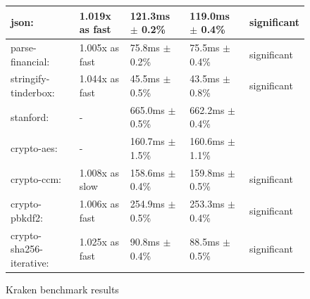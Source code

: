 \documentclass{article}
\begin{document}
\begin{figure}[H]
\begin{tabular}{|l|l|l|l|l|}
\hline\hline
      json:                     & 1.019x as fast   &  121.3ms $\pm$ 0.2\% &   119.0ms $\pm$ 0.4\%  &   significant\\
\hline\hspace{0.5em} parse-financial:        & 1.005x as fast   &   75.8ms $\pm$ 0.2\% &    75.5ms $\pm$ 0.4\%  &   significant\\
\hline\hspace{0.5em} stringify-tinderbox:    & 1.044x as fast   &   45.5ms $\pm$ 0.5\% &    43.5ms $\pm$ 0.8\%  &   significant\\
\hline\hline
      stanford:                 & -                &  665.0ms $\pm$ 0.5\% &   662.2ms $\pm$ 0.4\%  &\\
\hline\hspace{0.5em} crypto-aes:             & -                &  160.7ms $\pm$ 1.5\% &   160.6ms $\pm$ 1.1\%  &\\
\hline\hspace{0.5em} crypto-ccm:             & 1.008x as slow &  158.6ms $\pm$ 0.4\% &   159.8ms $\pm$ 0.5\%  &   significant\\
\hline\hspace{0.5em} crypto-pbkdf2:          & 1.006x as fast   &  254.9ms $\pm$ 0.5\% &   253.3ms $\pm$ 0.4\%  &   significant\\
\hline\hspace{0.5em} crypto-sha256-iterative:& 1.025x as fast   &   90.8ms $\pm$ 0.4\% &    88.5ms $\pm$ 0.5\%  &   significant \\
\hline
\end{tabular}
\caption{Kraken benchmark results}
\label{fig:kraken}
\end{figure}
\end{document}
